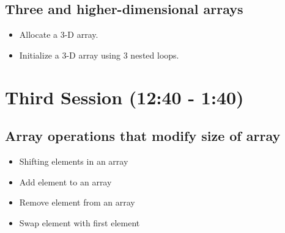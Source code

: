\documentclass[11pt]{article}
\begin{document}
\subsection{Three and higher-dimensional arrays}
\label{sec-2-2}
\begin{itemize}
\item Allocate a 3-D array.
\item Initialize a 3-D array using 3 nested loops.
\end{itemize}
\section{Third Session (12:40 - 1:40)}
\label{sec-3}
\subsection{Array operations that modify size of array}
\label{sec-3-1}
\begin{itemize}
\item Shifting elements in an array
\item Add element to an array
\item Remove element from an array
\item Swap element with first element
\end{itemize}
\end{document}
